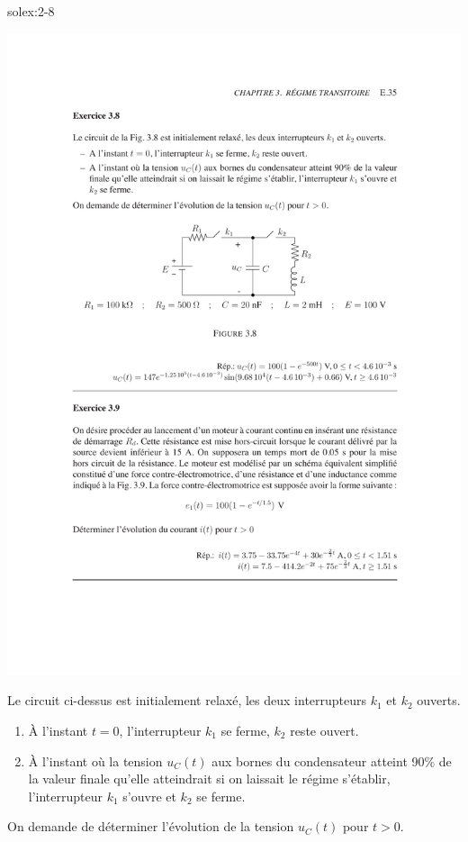\begin{exwithsol}{}{solex:2-8}
	\label{ex:2-8}
\begin{center}
	\includegraphics[width=0.95\linewidth]{exercices/ex-3-8}
\end{center}
Le circuit ci-dessus est initialement relax\'e, les deux
interrupteurs $k_1$ et $k_2$ ouverts. 
\begin{enumerate}
	\item \`A l'instant $t=0$, l'interrupteur $k_1$ se ferme, $k_2$ reste
	ouvert.
	\item \`A l'instant o\`u la tension $u_C(t)$ aux bornes du condensateur
	atteint 90\% de la valeur finale qu'elle atteindrait si on laissait
	le r\'egime s'\'etablir, l'interrupteur $k_1$ s'ouvre et $k_2$ se ferme.
\end{enumerate}
On demande de d\'eterminer l'\'evolution de la tension $u_C(t)$ pour $t>0$.

\end{exwithsol}

